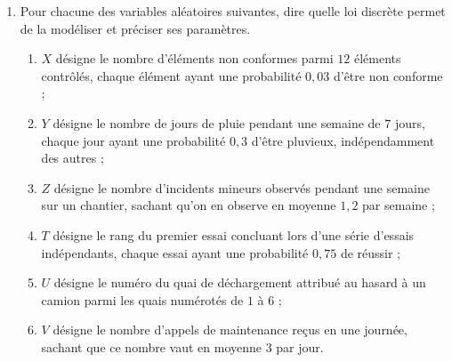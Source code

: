 \begin{enumerate}
    \item Pour chacune des variables al\'eatoires suivantes, dire quelle loi discr\`ete permet de la mod\'eliser et pr\'eciser ses param\`etres.
    \begin{enumerate}
        \item $X$ d\'esigne le nombre d'\'el\'ements non conformes parmi $12$ \'el\'ements contr\^ol\'es, chaque \'el\'ement ayant une probabilit\'e $0{,}03$ d'\^etre non conforme ;
        \item $Y$ d\'esigne le nombre de jours de pluie pendant une semaine de $7$ jours, chaque jour ayant une probabilit\'e $0{,}3$ d'\^etre pluvieux, ind\'ependamment des autres ;
        \item $Z$ d\'esigne le nombre d'incidents mineurs observ\'es pendant une semaine sur un chantier, sachant qu'on en observe en moyenne $1{,}2$ par semaine ;
        \item $T$ d\'esigne le rang du premier essai concluant lors d'une s\'erie d'essais ind\'ependants, chaque essai ayant une probabilit\'e $0{,}75$ de r\'eussir ;
        \item $U$ d\'esigne le num\'ero du quai de d\'echargement attribu\'e au hasard \`a un camion parmi les quais num\'erot\'es de $1$ \`a $6$ ;
        \item $V$ d\'esigne le nombre d'appels de maintenance re\c cus en une journ\'ee, sachant que ce nombre vaut en moyenne $3$ par jour.
    \end{enumerate}
    
\end{enumerate}


